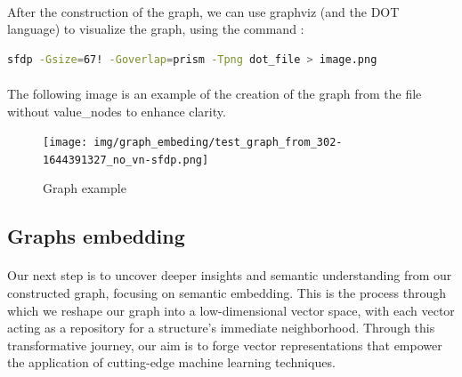         \paragraph{}After the construction of the graph, we can use graphviz (and the DOT language)\cite{farin_graphviz_2004} to visualize the graph, using the command :
        \begin{lstlisting}[language=bash]
            sfdp -Gsize=67! -Goverlap=prism -Tpng dot_file > image.png
        \end{lstlisting}

        \paragraph{}The following image is an example of the creation of the graph from the file  without \glspl{value_node} to enhance clarity.
        \begin{figure}[H]
            \centering
            \texttt{[image: img/graph\_embeding/test\_graph\_from\_302-1644391327\_no\_vn-sfdp.png]}
            \caption{Graph example}
            \label{fig:graph_embedding:graph_example}
        \end{figure}

    \subsection{Graphs embedding}

    \paragraph{}Our next step is to uncover deeper insights and semantic understanding from our constructed graph, focusing on semantic embedding. This is the process through which we reshape our graph into a low-dimensional vector space, with each vector acting as a repository for a \gls{structure}'s immediate neighborhood. Through this transformative journey, our aim is to forge vector representations that empower the application of cutting-edge machine learning techniques.

